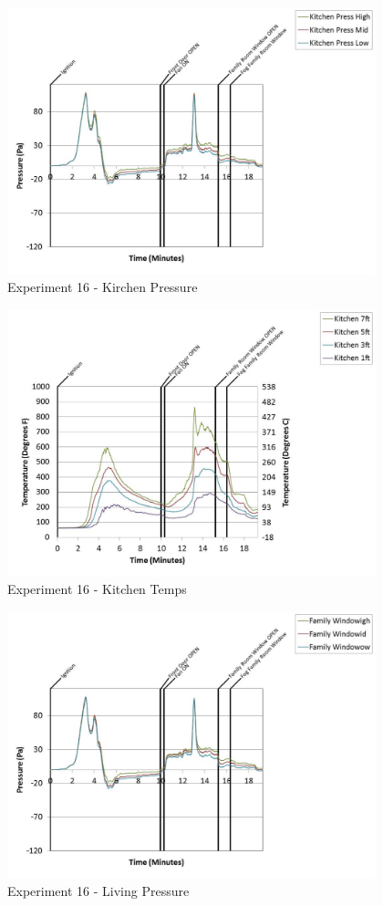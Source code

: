 \documentclass{article}
\begin{document}
\begin{appendices}
	\clearpage

	\begin{figure}[h!]
		\centering
		\includegraphics[height=3.05in]{0_Images/Results_Charts/Exp_16_Charts/KirchenPressure.pdf}
		\caption{Experiment 16 - Kirchen Pressure}
	\end{figure}
 

	\begin{figure}[h!]
		\centering
		\includegraphics[height=3.05in]{0_Images/Results_Charts/Exp_16_Charts/KitchenTemps.pdf}
		\caption{Experiment 16 - Kitchen Temps}
	\end{figure}
 
	\clearpage

	\begin{figure}[h!]
		\centering
		\includegraphics[height=3.05in]{0_Images/Results_Charts/Exp_16_Charts/LivingPressure.pdf}
		\caption{Experiment 16 - Living Pressure}
	\end{figure}
 


\end{appendices}
\end{document}
